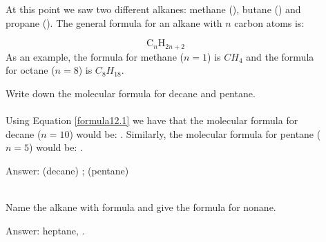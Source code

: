 \documentclass[main.tex]{subfiles}
\newcommand{\mytriangleright}[1]{\tikz{\filldraw[draw=#1,fill=#1] (0,0) --(0em,0.6em) -- (0.4em,0.3em);}}
\begin{document}
\begin{description}
\item[] At this point we saw two different alkanes: methane (), butane () and propane (). The general formula for an alkane with $n$ carbon atoms is:

\begin{equation}
 \text{C}_n\text{H}_{2n+2}
 \label{formula12.1}
 \end{equation}
 As an example, the formula for methane ($n=1$) is $ CH_{4}$ and the formula for octane ($n=8$) is $ C_8H_{18}$.



\begin{example} %
Write down the molecular formula for decane and pentane.
\\
\\
Using Equation \ref{formula12.1} we have that the molecular formula for decane ($n=10$) would be: . Similarly, the molecular formula for pentane ($n=5$) would be: .
\begin{flushright}  \mytriangleright{dgreen}\small Answer: (decane) ; (pentane)  \end{flushright}
\faDiamond\ \\
Name the alkane with formula  and give the formula for nonane.
\begin{flushright} \mytriangleright{dgreen}\small Answer: heptane, .\end{flushright}\end{example}%


 




















\end{description}
\end{document}
